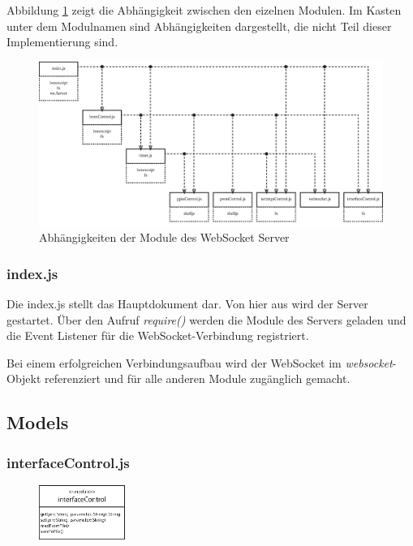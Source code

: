 Abbildung \ref{fig:wssDependencies} zeigt die Abhängigkeit zwischen den eizelnen Modulen. Im Kasten unter dem Modulnamen sind Abhängigkeiten dargestellt, die nicht Teil dieser Implementierung sind.

\begin{figure}[ht]
  \centering
  \includegraphics[width = \textwidth]{documentation/images/wssDependencies.eps}
  \caption{Abhängigkeiten der Module des WebSocket Server}
  \label{fig:wssDependencies}
\end{figure}

\subsubsection{index.js}
Die index.js stellt das Hauptdokument dar. Von hier aus wird der Server gestartet. Über den Aufruf \textit{require()} werden die Module des Servers geladen und die Event Listener für die WebSocket-Verbindung registriert.

Bei einem erfolgreichen Verbindungsaufbau wird der WebSocket im \textit{websocket}-Objekt referenziert und für alle anderen Module zugänglich gemacht.


\subsection{Models}

\subsubsection{interfaceControl.js}
\begin{figure}
  \vspace{-16pt}
  \centering
  \includegraphics[width = 0.25\textwidth]{documentation/images/apiInterfaceControl.eps}
\end{figure}

